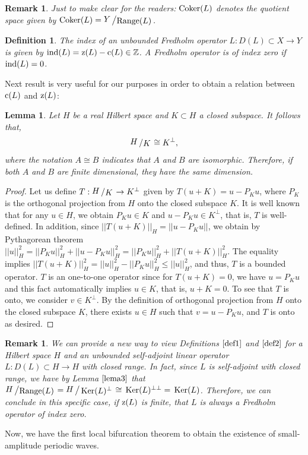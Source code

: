 \documentclass[12pt,reqno,a4paper]{amsart} %
\newcommand{\Ker}{{\rm \,Ker}}
\newcommand{\bigslant}[2]{{\raisebox{.1em}{$#1$}\left/\raisebox{-.1em}{$#2$}\right.}}
\numberwithin{equation}{section}
\numberwithin{figure}{section}
\newtheorem{remark}[theorem]{Remark}
\newtheorem{lemma}[theorem]{Lemma}
\newtheorem{definition}[theorem]{Definition}
\begin{document}
			\begin{remark}
				Just to make clear for the readers: ${\rm Coker}(L)$ denotes the quotient space given by ${\rm Coker}(L)=\bigslant{Y}{{\rm Range}(L)}$.		
			\end{remark}
			
			\begin{definition}\label{def2} The index of an unbounded Fredholm operator $L:D(L)\subset X\rightarrow Y$ is given by ${\rm ind}(L)={\rm{z}}(L)-{\rm{c}}(L)\in \mathbb{Z}$. A Fredholm operator is of index zero if ${\rm ind}(L)=0$.		
				\end{definition}
			\indent Next result is very useful for our purposes in order to obtain a relation between ${\rm{c}}(L)$ and ${\rm{z}}(L)$:
			
			
			\begin{lemma}\label{lema3} Let $H$ be a real Hilbert space and $K\subset H$ a closed subspace. It follows that, $$\bigslant{H}{K}\cong K^{\bot},$$
			where the notation $A \cong B$ indicates that $A$ and $B$ are isomorphic. Therefore, if both $A$ and $B$ are finite dimensional, they have the same dimension.

				
			\end{lemma}				
			\begin{proof} Let us define $T:\bigslant{H}{K}\rightarrow K^{\bot}$ given by $T(u+K)=u-P_Ku$, where $P_K$ is the orthogonal projection from $H$ onto the closed subspace $K$. It is well known that for any $u\in H$, we obtain $P_Ku\in K$ and $u-P_Ku\in K^{\bot}$, that is, $T$ is well-defined. In addition, since $||T(u+K)||_H=||u-P_Ku||$, we obtain by Pythagorean theorem  $||u||_{H}^2=||P_Ku||_H^2+||u-P_Ku||_H^2=||P_Ku||_H^2+||T(u+K)||_H^2.$
				The equality implies $||T(u+K)||_H^2=||u||_{H}^2-||P_Ku||_H^2\leq ||u||_{H}^2$, and thus, $T$ is a bounded operator. $T$ is an one-to-one operator since for $T(u+K)=0$, we have $u=P_Ku$ and this fact automatically implies $u\in K$, that is, $u+K=0$. To see that $T$ is onto, we consider $v\in K^{\bot}$. By the definition of orthogonal projection from $H$ onto the closed subspace $K$, there exists $u\in H$ such that $v=u-P_Ku$, and $T$ is onto as desired.
				
			\end{proof}
			
			\begin{remark}\label{obs2} We can provide a new way to view Definitions $\ref{def1}$ and $\ref{def2}$ for a Hilbert space $H$ and an unbounded self-adjoint linear operator $L:D(L)\subset H\rightarrow H$ with closed range. In fact, since $L$ is self-adjoint with closed range, we have by Lemma $\ref{lema3}$ that $\bigslant{H}{{\rm Range}(L)}= \bigslant{H}{\Ker(L)^{\bot}}\cong\Ker(L)^{{\bot}{\bot}}=\Ker(L)$. Therefore, we can conclude in this specific case, if ${\rm z}(L)$ is finite, that $L$ is always a Fredholm operator of index zero.	
				
			\end{remark}
			\indent Now, we have the first local bifurcation theorem to obtain the existence of small-amplitude periodic waves.
			
\end{document}
